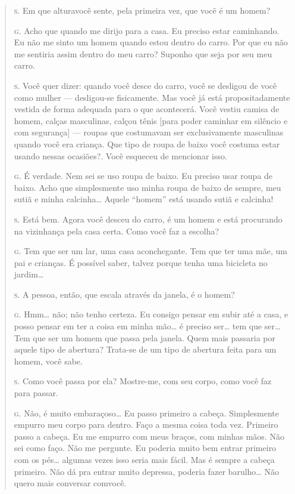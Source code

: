 \begin{quote}

\noindent\hskip0mm\textsc{s.} Em que altura\idxidenhis[|(] você sente, pela primeira vez, que você é um homem?

\noindent\hskip0mm\textsc{g.} Acho que quando me dirijo para a casa. Eu preciso estar caminhando.
Eu não me sinto um homem quando estou dentro do carro. Por que eu não
me sentiria assim dentro do meu carro? Suponho que seja por seu meu
carro.

\noindent\hskip0mm\textsc{s.} Você quer dizer: quando você desce do carro, você se desligou de você
como mulher --- desligou-se fisicamente. Mas você já está
propositadamente vestida de forma adequada para o que acontecerá.
Você vestiu camisa de homem, calças masculinas, calçou tênis [para
poder caminhar em silêncio e com segurança] --- roupas que costumavam
ser exclusivamente masculinas quando você era criança. Que tipo de
roupa de baixo você costuma estar usando nessas ocasiões?. Você esqueceu de mencionar isso.

\noindent\hskip0mm\textsc{g.} É verdade. Nem sei se uso roupa de baixo. Eu preciso usar roupa de
baixo. Acho que simplesmente uso minha roupa de baixo de sempre, meu
sutiã e minha calcinha\ldots{} Aquele ``homem''
está usando sutiã e calcinha!

\noindent\hskip0mm\textsc{s.} Está bem. Agora você desceu do carro, é um homem e está procurando na
vizinhança pela casa certa. Como você faz a escolha?

\noindent\hskip0mm\textsc{g.} Tem que ser um lar, uma casa aconchegante. Tem que ter uma mãe, um
pai e crianças. É possível saber, talvez porque tenha uma bicicleta no
jardim\ldots{}

\noindent\hskip0mm\textsc{s.} A pessoa, então, que escala através da janela, é o homem?

\noindent\hskip0mm\textsc{g.} Hmm\ldots{} não; não tenho certeza. Eu consigo pensar em subir até a casa,
e posso pensar em ter a coisa em minha mão\ldots{} é preciso ser\ldots{} tem que
ser\ldots{} Tem que ser um homem que passa pela janela. Quem mais passaria
por aquele tipo de abertura? Trata-se de um tipo de abertura feita para
um homem, você sabe.

\noindent\hskip0mm\textsc{s.} Como você passa por ela? Mostre-me, com seu corpo, como você faz para
passar.

\noindent\hskip0mm\textsc{g.} Não, é muito embaraçoso\ldots{} Eu passo primeiro a cabeça. Simplesmente
empurro meu corpo para dentro. Faço a mesma coisa toda vez. Primeiro
passo a cabeça. Eu me empurro com meus braços, com minhas mãos. Não sei
como faço. Não me pergunte. Eu poderia muito bem entrar primeiro com os
pés\ldots{} algumas vezes isso seria mais fácil. Mas é sempre a cabeça
primeiro. Não dá pra entrar muito depressa, poderia fazer barulho\ldots{}
Não quero mais conversar com\idxidenhis[|)] você.


\end{quote}

